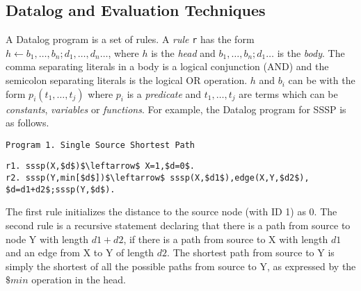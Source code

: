 
\subsection{Datalog and Evaluation Techniques}

A Datalog program is a set of rules. A \emph{rule} \texttt{r} has the form $h\leftarrow b_1,\ldots,b_n;d_1,\ldots,d_n\ldots$, where $h$ is the \emph{head} and $b_1,\ldots,b_n;d_1\ldots$ is the \emph{body}. The comma separating literals in a body is a logical conjunction (AND) and the semicolon separating literals is the logical OR operation. $h$ and $b_i$ can be with the form $p_i(t_1,\ldots,t_j)$ where $p_i$ is a \emph{predicate} and $t_1,\ldots,t_j$ are terms which can be \emph{constants}, \emph{variables} or \emph{functions}. For example, the Datalog program for SSSP is as follows.
\begin{verbatim}
Program 1. Single Source Shortest Path
\end{verbatim}
\vspace{-0.1in}
\small
\begin{lstlisting}
r1. sssp(X,$d$)$\leftarrow$ X=1,$d=0$.
r2. sssp(Y,min[$d$])$\leftarrow$ sssp(X,$d1$),edge(X,Y,$d2$),
$d=d1+d2$;sssp(Y,$d$).
\end{lstlisting}
\normalsize
The first rule initializes the distance to the source node (with ID 1) as 0. The second rule is a recursive statement declaring that there is a path from source to node Y with length $d1+d2$, if there is a path from source to X with length $d1$ and an edge from X to Y of length $d2$. The shortest path from source to Y is simply the shortest of all the possible paths from source to Y, as expressed by the $\$min$ operation in the head.  

